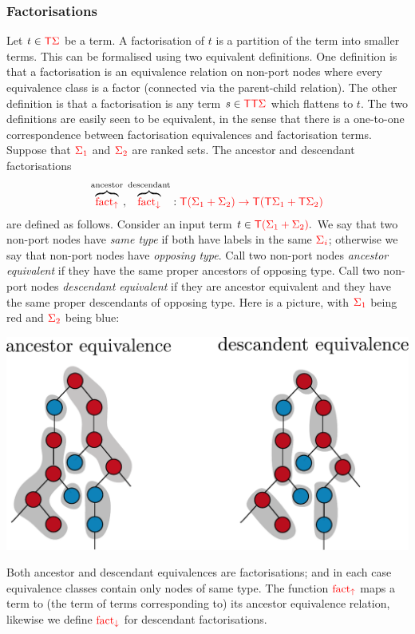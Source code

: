\subsubsection{Factorisations}
    Let $t \in {\color{red}{\mathsf T}} {\color{red}{\Sigma}}$ be a term. A factorisation of $t$ is a partition of the term into smaller terms. This can be formalised using two  equivalent definitions. One definition is that a factorisation is an equivalence relation on non-port nodes where every equivalence class is a factor (connected via the parent-child relation). The other definition is that a factorisation is any term $s  \in {\color{red}{\mathsf T}} {\color{red}{\mathsf T}} {\color{red}{\Sigma}}$ which flattens to $t$. 
    The two definitions are easily seen to be equivalent, in the sense that there is a one-to-one correspondence between factorisation equivalences and factorisation terms.
    Suppose that ${\color{red}{\Sigma_1}}$ and ${\color{red}{\Sigma_2}}$ are ranked sets. The ancestor and descendant factorisations 
        \begin{align*}
            \overbrace{{\color{red}{\mathrm{fact_{\uparrow}}}}}^{\text{ancestor}}, \overbrace{{\color{red}{\mathrm{fact_{\downarrow}}}}}^{\text{descendant}}  : {\color{red}{{\color{red}{\mathsf T}}(\Sigma_1+\Sigma_2) \to {\color{red}{\mathsf T}}({\color{red}{\mathsf T}}\Sigma_1 + {\color{red}{\mathsf T}}\Sigma_2)}}
        \end{align*}
        are defined as follows. Consider an input term
            $t \in {\color{red}{{\color{red}{\mathsf T}}(\Sigma_1+\Sigma_2)}}.$
        We say that two non-port nodes have \emph{same type} if both have labels in the same  ${\color{red}{\Sigma_i}}$; otherwise we say that non-port nodes have \emph{opposing type}.  Call two non-port nodes \emph{ancestor equivalent}  if they have the same proper ancestors of opposing type. Call two non-port nodes \emph{descendant equivalent}  if they  are ancestor equivalent and they have the same proper descendants of opposing type. Here is a picture, with ${\color{red}{\Sigma_1}}$ being red and ${\color{red}{\Sigma_2}}$ being blue: 
        \begin{center}
      \includegraphics[scale=.3]{facto-up-down.pdf}
        \end{center}
        Both ancestor and descendant equivalences are factorisations; and in each case equivalence classes contain only nodes of same type.  The function ${\color{red}{\mathrm{fact_{\uparrow}}}}$ maps a term to (the term of terms corresponding to) its ancestor equivalence relation, likewise we define ${\color{red}{\mathrm{fact_{\downarrow}}}}$ for  descendant factorisations.
    
